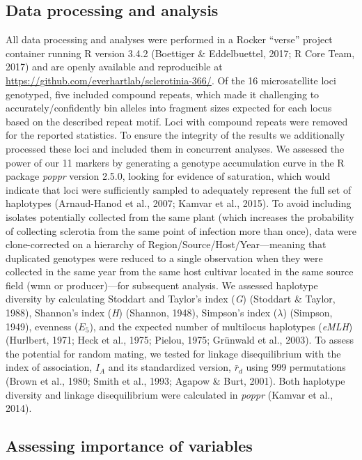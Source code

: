 \subsection*{Data processing and
analysis}\label{data-processing-and-analysis}

All data processing and analyses were performed in a Rocker ``verse''
project container running R version 3.4.2 (Boettiger \& Eddelbuettel,
2017; R Core Team, 2017) and are openly available and reproducible at
\url{https://github.com/everhartlab/sclerotinia-366/}. Of the 16
microsatellite loci genotyped, five included compound repeats, which
made it challenging to accurately/confidently bin alleles into fragment
sizes expected for each locus based on the described repeat motif. Loci
with compound repeats were removed for the reported statistics. To
ensure the integrity of the results we additionally processed these loci
and included them in concurrent analyses. We assessed the power of our
11 markers by generating a genotype accumulation curve in the R package
\emph{poppr} version 2.5.0, looking for evidence of saturation, which
would indicate that loci were sufficiently sampled to adequately
represent the full set of haplotypes (Arnaud-Hanod et al., 2007; Kamvar
et al., 2015). To avoid including isolates potentially collected from
the same plant (which increases the probability of collecting sclerotia
from the same point of infection more than once), data were
clone-corrected on a hierarchy of Region/Source/Host/Year---meaning that
duplicated genotypes were reduced to a single observation when they were
collected in the same year from the same host cultivar located in the
same source field (wmn or producer)---for subsequent analysis. We
assessed haplotype diversity by calculating Stoddart and Taylor's index
(\emph{G}) (Stoddart \& Taylor, 1988), Shannon's index (\emph{H})
(Shannon, 1948), Simpson's index (\(\lambda\)) (Simpson, 1949), evenness
(\(E_5\)), and the expected number of multilocus haplotypes
(\emph{eMLH}) (Hurlbert, 1971; Heck et al., 1975; Pielou, 1975; Grünwald
et al., 2003). To assess the potential for random mating, we tested for
linkage disequilibrium with the index of association, \(I_A\) and its
standardized version, \(\bar{r}_d\) using 999 permutations (Brown et
al., 1980; Smith et al., 1993; Agapow \& Burt, 2001). Both haplotype
diversity and linkage disequilibrium were calculated in \emph{poppr}
(Kamvar et al., 2014).

\subsection*{Assessing importance of
variables}\label{assessing-importance-of-variables}

